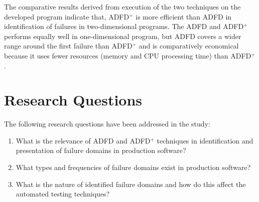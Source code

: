 The comparative results derived from execution of the two techniques on the developed program indicate that, ADFD$^+$ is more efficient than ADFD in identification of failures in two-dimensional programs. The ADFD and ADFD$^+$ performs equally well in one-dimensional program, but ADFD covers a wider range around the first failure than ADFD$^+$ and is comparatively economical because it uses fewer resources (memory and CPU processing time) than ADFD$^+$.


\section{Research Questions} \label{sec:questions}
The following research questions have been addressed in the study:
\begin{enumerate}
%
\item What is the relevance of ADFD and ADFD$^+$ techniques in identification and presentation of failure domains in production software? %

%
%
\item What types and frequencies of failure domains exist in production software? %
%
\item What is the nature of identified failure domains and how do this affect the automated testing techniques? %


\end{enumerate}
